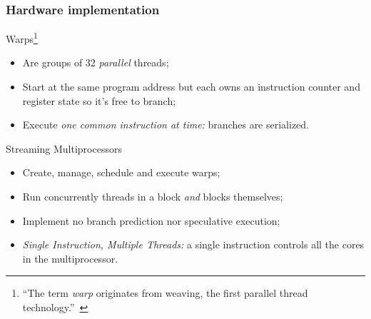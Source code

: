 {


\begin{frame}
	\frametitle{Hardware implementation}

	\begin{block}{Warps\footnote{``The term \emph{warp} originates from weaving, the first parallel thread technology.''~\cite[p.~69]{cuda:programming}}}
		\begin{itemize}
			\item Are groups of 32 \emph{parallel} threads;
			\item Start at the same program address but each owns an instruction counter and register state so it's free to branch;
			\item Execute \emph{one common instruction at time:} \alert{branches are serialized}.
		\end{itemize}
	\end{block}

	\begin{block}{Streaming Multiprocessors}
		\begin{itemize}
			\item Create, manage, schedule and execute warps;
			\item Run concurrently threads in a block \emph{and} blocks themselves;
			\item Implement no branch prediction nor speculative execution;
			\item \emph{Single Instruction, Multiple Threads:} a single instruction controls all the \cuda{} cores in the multiprocessor.
		\end{itemize}
	\end{block}
\end{frame}
}
